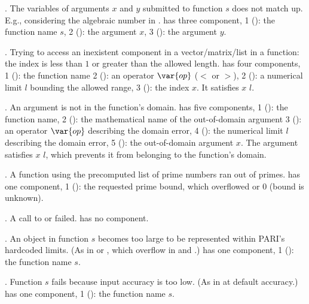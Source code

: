  \item {}. The variables of arguments $x$ and $y$ submitted
 to function $s$ does not match up. E.g., considering the algebraic number
  in .
  has three component, 1 (): the function name $s$, 2
 (): the argument $x$, 3 (): the argument $y$.


 \item {}. Trying to access an inexistent component in a
 vector/matrix/list in a function: the index is less than $1$ or greater
 than the allowed length.
  has four components,
 1 (): the function name
 2 (): an operator $\var{op}$ ($<$ or $>$),
 2 (): a numerical limit $l$ bounding the allowed range,
 3 (): the index $x$. It satisfies $x$  $l$.

 \item {}. An argument is not in the function's domain.
  has five components, 1 (): the function name,
 2 (): the mathematical name of the out-of-domain argument
 3 (): an operator $\var{op}$ describing the domain error,
 4 (): the numerical limit $l$ describing the domain error,
 5 (): the out-of-domain argument $x$. The argument satisfies $x$
  $l$, which prevents it from belonging to the function's domain.

 \item {}. A function using the precomputed list of prime
 numbers ran out of primes.
  has one component, 1 (): the requested prime bound, which
 overflowed  or $0$ (bound is unknown).

 \item {}. A call to  or 
 failed.  has no component.

 \item {}. An object in function $s$ becomes too large to be
 represented within PARI's hardcoded limits. (As in  or
 , which overflow in  and .)
  has one component, 1 (): the function name $s$.

 \item {}. Function $s$ fails because input accuracy is too low.
 (As in  at default accuracy.)
  has one component, 1 (): the function name $s$.

